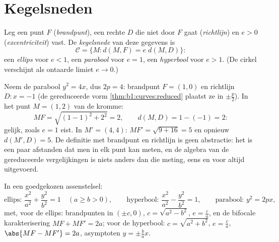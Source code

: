 \section{Kegelsneden}

\begin{definition}\label{def:b1:curves:conics}
Leg een punt $F$ (\emph{brandpunt}), een rechte $D$ die niet door
$F$ gaat (\emph{richtlijn}) en $e > 0$ (\emph{excentriciteit}) vast.
De \emph{kegelsnede} van deze gegevens is
\[
\mathcal{C} = \{M : d(M, F) = e\; d(M, D)\}:
\]
een \emph{ellips} voor $e < 1$, een \emph{parabool} voor $e = 1$,
een \emph{hyperbool} voor $e > 1$. (De cirkel verschijnt als
ontaarde limiet $e \to 0$.)
\end{definition}

\begin{example}
\label{ex:b1:curves:parabolacheck}
Neem de parabool $y^2 = 4x$, dus $2p = 4$: brandpunt $F = (1, 0)$
en richtlijn $D : x = -1$ (de gereduceerde vorm
\cref{thm:b1:curves:reduced} plaatst ze in $\pm\frac p2$). In het
punt $M = (1, 2)$ van de kromme:
\[
MF = \sqrt{(1-1)^2 + 2^2} = 2,
\qquad
d(M, D) = 1 - (-1) = 2 :
\]
gelijk, zoals $e = 1$ eist. In $M' = (4, 4)$: $MF' = \sqrt{9 +
16} = 5$ en opnieuw $d(M', D) = 5$. De definitie met brandpunt en
richtlijn is geen abstractie: het is een paar afstanden dat men in
elk punt kan meten, en de algebra van de gereduceerde
vergelijkingen is niets anders dan die meting, eens en voor altijd
uitgevoerd.
\end{example}

\begin{theorem}\label{thm:b1:curves:reduced}
In een goedgekozen  assenstelsel:
\[
\text{ellips: } \frac{x^2}{a^2} + \frac{y^2}{b^2} = 1
\quad (a \geq b > 0),
\qquad
\text{hyperbool: } \frac{x^2}{a^2} - \frac{y^2}{b^2} = 1,
\qquad
\text{parabool: } y^2 = 2px,
\]
met, voor de ellips: brandpunten in $(\pm c, 0)$, $c = \sqrt{a^2 -
b^2}$, $e = \frac ca$, en de bifocale karakterisering $MF + MF' =
2a$; voor de hyperbool: $c = \sqrt{a^2 + b^2}$, $e = \frac ca$,
$\abs{MF - MF'} = 2a$, asymptoten $y = \pm\frac ba x$.
\end{theorem}

